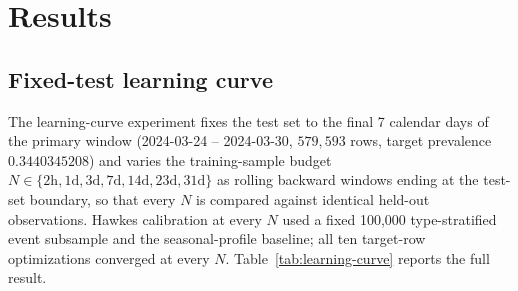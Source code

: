 \section{Results}
\label{sec:results}

\subsection{Fixed-test learning curve}
\label{sec:results-learning-curve}

The learning-curve experiment fixes the test set to the final 7 calendar
days of the primary window (2024-03-24 -- 2024-03-30, $579{,}593$ rows,
target prevalence $0.3440345208$) and varies the training-sample budget
$N \in \{2\text{h}, 1\text{d}, 3\text{d}, 7\text{d}, 14\text{d}, 23\text{d},
31\text{d}\}$ as rolling backward windows ending at the test-set boundary,
so that every $N$ is compared against identical held-out observations.
Hawkes calibration at every $N$ used a fixed 100{,}000 type-stratified
event subsample and the seasonal-profile baseline; all ten target-row
optimizations converged at every $N$. Table~\ref{tab:learning-curve}
reports the full result.

\begin{table}[htbp]
\centering
\caption{Fixed-test learning curve, PR-AUC and Brier score by training
budget $N$. Test set: 2024-03-24 -- 2024-03-30 (579{,}593 rows,
prevalence 0.3440). $\rho(\boldsymbol\Gamma)$ is the fitted spectral
radius; the post-hoc stationarity projection did not bind at any $N$
(scale $=1.0$ throughout).}
\label{tab:learning-curve}
\end{table}

